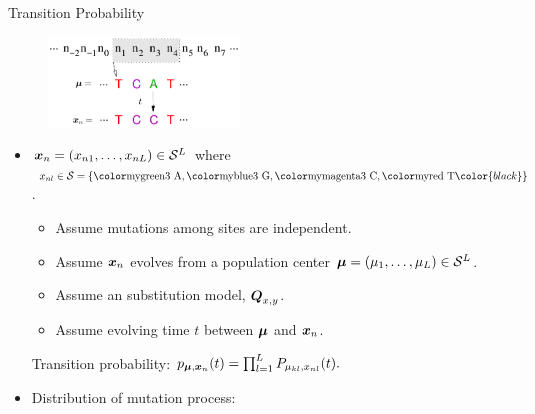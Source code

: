 \documentclass{beamer}
\begin{document}
\begin{frame}{Transition Probability}

\vspace{-0.3cm}
\begin{figure}
\centering
  \includegraphics[width=2.0in]{./graph/nucle_figure}
\end{figure}

\vspace{-0.4cm}
\begin{itemize}
\item
$\boldsymbol{x}_n = (x_{n1}, \ldots, x_{nL}) \in \mathcal{S}^L$ where
$x_{nl} \in \mathcal{S} = \{\colorA, \colorG, \colorC, \colorT \color{black} \}$. \\

\begin{itemize}
\item Assume mutations among sites are independent.

\item Assume $\boldsymbol{x}_n$ evolves from a population center
      $\boldsymbol{\mu} = (\mu_1,\ldots, \mu_L) \in \mathcal{S}^L$.

\item Assume an substitution model, $\boldsymbol{Q}_{x,y}$.

\item Assume evolving time $t$ between $\boldsymbol{\mu}$ and $\boldsymbol{x}_n$.
\end{itemize}
Transition probability:
$
p_{\boldsymbol{\mu},\boldsymbol{x}_n}(t)
= \prod_{l = 1}^L P_{\mu_{kl}, x_{nl}}(t).
$

\item
Distribution of mutation process:
\begin{center}
\end{center}

\end{itemize}

\end{frame}

\end{document}
